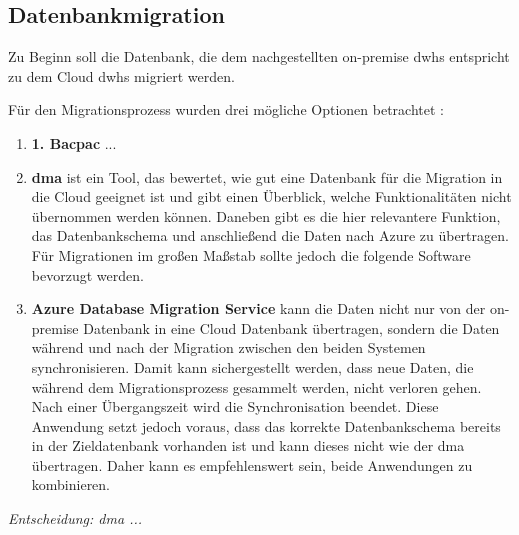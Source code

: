 \subsection{Datenbankmigration} \label{subsec:praktischeUmsetzung:Datenmigration}
Zu Beginn soll die Datenbank, die dem nachgestellten on-premise \acp{dwh} entspricht zu dem Cloud \acp{dwh} migriert werden. 

Für den Migrationsprozess wurden drei mögliche Optionen betrachtet \cite{soh_microsoft_2020}: 
\begin{enumerate}
\item \textbf{1. Bacpac} ...
\item \textbf{\ac{dma}} ist ein Tool, das bewertet, wie gut eine Datenbank für die Migration in die Cloud geeignet ist und gibt einen Überblick, welche Funktionalitäten nicht übernommen werden können. Daneben gibt es die hier relevantere Funktion, das Datenbankschema und anschließend die Daten nach Azure zu übertragen. Für Migrationen im großen Maßstab sollte jedoch die folgende Software bevorzugt werden. 
\item \textbf{Azure Database Migration Service} kann die Daten nicht nur von der on-premise Datenbank in eine Cloud Datenbank übertragen, sondern die Daten während und nach der Migration zwischen den beiden Systemen synchronisieren. Damit kann sichergestellt werden, dass neue Daten, die während dem Migrationsprozess gesammelt werden, nicht verloren gehen. Nach einer Übergangszeit wird die Synchronisation beendet. Diese Anwendung setzt jedoch voraus, dass das korrekte Datenbankschema bereits in der Zieldatenbank vorhanden ist und kann dieses nicht wie der \ac{dma} übertragen. Daher kann es empfehlenswert sein, beide Anwendungen zu kombinieren.
\end{enumerate}

\textit{Entscheidung: \ac{dma} ...}

